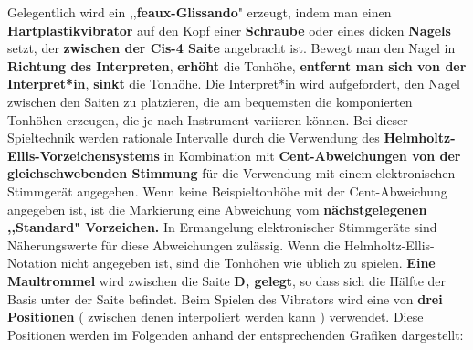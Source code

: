 \documentclass[12pt]{article}
\newcommand*\circled[1]{\tikz[baseline=(char.base)]{
            \node[shape=circle,draw,inner sep=1pt] (char) {#1};}}
\begin{document}
\textbf{\circled{2}} Gelegentlich wird ein ,,\textbf{feaux-Glissando}" erzeugt, indem man einen \textbf{Hartplastikvibrator} auf den Kopf einer \textbf{Schraube} oder eines dicken \textbf{Nagels} setzt, der \textbf{zwischen der Cis-4 Saite} angebracht ist. Bewegt man den Nagel in \textbf{Richtung des Interpreten}, \textbf{erhöht} die Tonhöhe, \textbf{entfernt man sich von der Interpret*in}, \textbf{sinkt} die Tonhöhe. Die Interpret*in wird aufgefordert, den Nagel zwischen den Saiten zu platzieren, die am bequemsten die komponierten Tonhöhen erzeugen, die je nach Instrument variieren können. Bei dieser Spieltechnik werden rationale Intervalle durch die Verwendung des \textbf{Helmholtz-Ellis-Vorzeichensystems} in Kombination mit \textbf{Cent-Abweichungen von der gleichschwebenden Stimmung} für die Verwendung mit einem elektronischen Stimmgerät angegeben. Wenn keine Beispieltonhöhe mit der Cent-Abweichung angegeben ist, ist die Markierung eine Abweichung vom \textbf{nächstgelegenen ,,Standard" Vorzeichen.} In Ermangelung elektronischer Stimmgeräte sind Näherungswerte für diese Abweichungen zulässig. Wenn die Helmholtz-Ellis-Notation nicht angegeben ist, sind die Tonhöhen wie üblich zu spielen.  \textbf{\circled{3} Eine Maultrommel} wird zwischen die Saite \textbf{D, gelegt}, so dass sich die Hälfte der Basis unter der Saite befindet. Beim Spielen des Vibrators wird eine von \textbf{drei Positionen} ( zwischen denen interpoliert werden kann ) verwendet. Diese Positionen werden im Folgenden anhand der entsprechenden Grafiken dargestellt:
\end{document}
